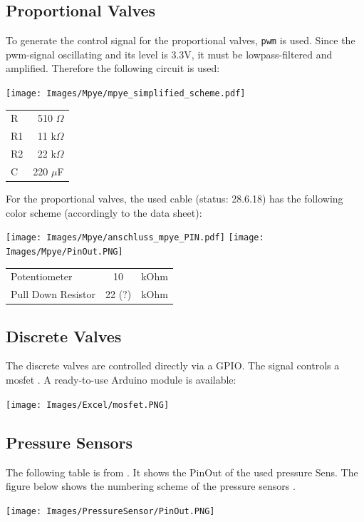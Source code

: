 \documentclass[
	fontsize=10pt
	paper=a4
]{scrartcl}
\begin{document}
\subsection{Proportional Valves}

To generate the control signal for the proportional valves, \texttt{pwm} is used.
Since the pwm-signal oscillating and its level is 3.3V, it must be lowpass-filtered and amplified.
Therefore the following circuit is used:

\texttt{[image: Images/Mpye/mpye\_simplified\_scheme.pdf]}
\begin{tabular}{lr}
R & 510 $\Omega$ \\
R1 & 11 k$\Omega$ \\
R2 & 22 k$\Omega$ \\
C & 220 $\mu$F
\end{tabular}

For the proportional valves, the used cable (status: 28.6.18) has the following color scheme (accordingly to the data sheet\cite[p. 9]{MPYE_DATASHEET}):


\texttt{[image: Images/Mpye/anschluss\_mpye\_PIN.pdf]}
\texttt{[image: Images/Mpye/PinOut.PNG]}

\begin{tabular}{lcr}
Potentiometer & 10 & kOhm \\
Pull Down Resistor & 22 (?) & kOhm \\
\end{tabular}


\subsection{Discrete Valves}	
The discrete valves are controlled directly via a GPIO.
The signal controls a mosfet \cite{IRF540_DATASHEET}.
A ready-to-use Arduino module is available:

\texttt{[image: Images/Excel/mosfet.PNG]}



\subsection{Pressure Sensors}

The following table is from \cite[p. 30]{SSC_DATASHEET}. 
It shows the PinOut of the used pressure Sens.
The figure below shows the numbering scheme of the pressure sensors \cite[p. 19]{SSC_DATASHEET}.

\texttt{[image: Images/PressureSensor/PinOut.PNG]}
\end{document}
